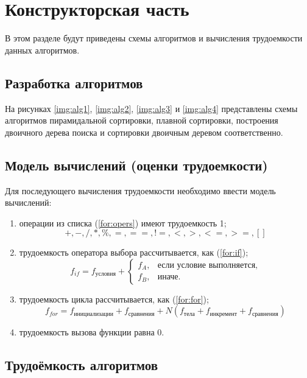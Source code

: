 \chapter{Конструкторская часть}
В этом разделе будут приведены схемы алгоритмов и вычисления трудоемкости данных алгоритмов.

\section{Разработка алгоритмов}

На рисунках \ref{img:alg1}, \ref{img:alg2}, \ref{img:alg3} и \ref{img:alg4} представлены схемы алгоритмов пирамидальной сортировки, плавной сортировки, построения двоичного дерева поиска и сортировки двоичным деревом соответственно.

\section{Модель вычислений (оценки трудоемкости)}

Для последующего вычисления трудоемкости необходимо ввести модель вычислений:
\begin{enumerate}
	\item операции из списка (\ref{for:opers}) имеют трудоемкость 1;
	\begin{equation}
		\label{for:opers}
		+, -, /, *, \%, =, ==, !=, <, >, <=, >=, []
	\end{equation}
	\item трудоемкость оператора выбора  рассчитывается, как (\ref{for:if});
	\begin{equation}
		\label{for:if}
		f_{if} = f_{\text{условия}} +
		\begin{cases}
			f_A, & \text{если условие выполняется,}\\
			f_B, & \text{иначе.}
		\end{cases}
	\end{equation}
	\item трудоемкость цикла рассчитывается, как (\ref{for:for});
	\begin{equation}
		\label{for:for}
		f_{for} = f_{\text{инициализации}} + f_{\text{сравнения}} + N(f_{\text{тела}} + f_{\text{инкремент}} + f_{\text{сравнения}})
	\end{equation}
	\item трудоемкость вызова функции равна 0.
\end{enumerate}

\section{Трудоёмкость алгоритмов}

